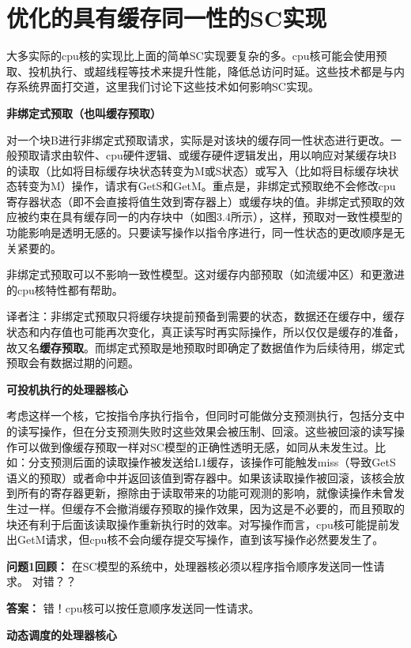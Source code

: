 \documentclass[UTF-8]{ctexrep}
\begin{document}
\section{优化的具有缓存同一性的SC实现}
大多实际的cpu核的实现比上面的简单SC实现要复杂的多。cpu核可能会使用预取、投机执行、或超线程等技术来提升性能，降低总访问时延。这些技术都是与内存系统界面打交道，这里我们讨论下这些技术如何影响SC实现。
\par \textbf{非绑定式预取（也叫缓存预取）}
\par 对一个块B进行非绑定式预取请求，实际是对该块的缓存同一性状态进行更改。一般预取请求由软件、cpu硬件逻辑、或缓存硬件逻辑发出，用以响应对某缓存块B的读取（比如将目标缓存块状态转变为M或S状态）或写入（比如将目标缓存块状态转变为M）操作，请求有GetS和GetM。重点是，非绑定式预取绝不会修改cpu寄存器状态（即不会直接将值生效到寄存器上）或缓存块的值。非绑定式预取的效应被约束在具有缓存同一的内存块中（如图3.4所示），这样，预取对一致性模型的功能影响是透明无感的。只要读写操作以指令序进行，同一性状态的更改顺序是无关紧要的。
\par 非绑定式预取可以不影响一致性模型。这对缓存内部预取（如流缓冲区）和更激进的cpu核特性都有帮助。
\par 译者注：非绑定式预取只将缓存块提前预备到需要的状态，数据还在缓存中，缓存状态和内存值也可能再次变化，真正读写时再实际操作，所以仅仅是缓存的准备，故又名\textbf{缓存预取}。而绑定式预取是地预取时即确定了数据值作为后续待用，绑定式预取会有数据过期的问题。
\par \textbf{可投机执行的处理器核心}
\par 考虑这样一个核，它按指令序执行指令，但同时可能做分支预测执行，包括分支中的读写操作，但在分支预测失败时这些效果会被压制、回滚。这些被回滚的读写操作可以做到像缓存预取一样对SC模型的正确性透明无感，如同从未发生过。比如：分支预测后面的读取操作被发送给L1缓存，该操作可能触发miss（导致GetS语义的预取）或者命中并返回该值到寄存器中。如果该读取操作被回滚，该核会放到所有的寄存器更新，擦除由于读取带来的功能可观测的影响，就像读操作未曾发生过一样。但缓存不会撤消缓存预取的操作效果，因为这是不必要的，而且预取的块还有利于后面该读取操作重新执行时的效率。对写操作而言，cpu核可能提前发出GetM请求，但cpu核不会向缓存提交写操作，直到该写操作必然要发生了。
\begin{sidebarbox}
\par \textbf {问题1回顾：} 在SC模型的系统中，处理器核必须以程序指令顺序发送同一性请求。 对错？？
\par \textbf{答案：} 错！cpu核可以按任意顺序发送同一性请求。
\end{sidebarbox}
\par \textbf{动态调度的处理器核心}
\end{document}
